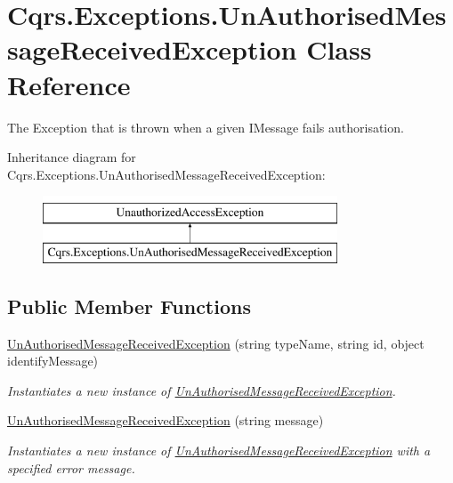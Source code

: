 \hypertarget{classCqrs_1_1Exceptions_1_1UnAuthorisedMessageReceivedException}{}\section{Cqrs.\+Exceptions.\+Un\+Authorised\+Message\+Received\+Exception Class Reference}
\label{classCqrs_1_1Exceptions_1_1UnAuthorisedMessageReceivedException}


The Exception that is thrown when a given I\+Message fails authorisation.  


Inheritance diagram for Cqrs.\+Exceptions.\+Un\+Authorised\+Message\+Received\+Exception\+:\begin{figure}[H]
\begin{center}
\leavevmode
\includegraphics[height=2.000000cm]{classCqrs_1_1Exceptions_1_1UnAuthorisedMessageReceivedException}
\end{center}
\end{figure}
\subsection*{Public Member Functions}
\begin{DoxyCompactItemize}
\item 
\hyperlink{classCqrs_1_1Exceptions_1_1UnAuthorisedMessageReceivedException_a7c84aaf8a9f346bcf5d8d05bfa274f39_a7c84aaf8a9f346bcf5d8d05bfa274f39}{Un\+Authorised\+Message\+Received\+Exception} (string type\+Name, string id, object identify\+Message)
\begin{DoxyCompactList}\small\item\em Instantiates a new instance of \hyperlink{classCqrs_1_1Exceptions_1_1UnAuthorisedMessageReceivedException}{Un\+Authorised\+Message\+Received\+Exception}. \end{DoxyCompactList}\item 
\hyperlink{classCqrs_1_1Exceptions_1_1UnAuthorisedMessageReceivedException_a1f6a9ee44242c36201764128953cab9f_a1f6a9ee44242c36201764128953cab9f}{Un\+Authorised\+Message\+Received\+Exception} (string message)
\begin{DoxyCompactList}\small\item\em Instantiates a new instance of \hyperlink{classCqrs_1_1Exceptions_1_1UnAuthorisedMessageReceivedException}{Un\+Authorised\+Message\+Received\+Exception} with a specified error message. \end{DoxyCompactList}\end{DoxyCompactItemize}


